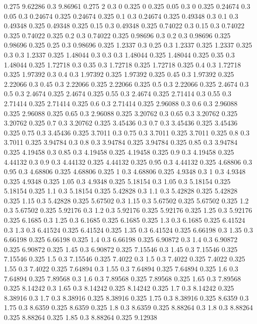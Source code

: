 0.275 9.62286
0.3 9.86961
0.275 2
0.3 0
0.325 0
0.325 0.05
0.3 0
0.325 0.24674
0.3 0.05
0.3 0.24674
0.325 0.24674
0.325 0.1
0.3 0.24674
0.325 0.49348
0.3 0.1
0.3 0.49348
0.325 0.49348
0.325 0.15
0.3 0.49348
0.325 0.74022
0.3 0.15
0.3 0.74022
0.325 0.74022
0.325 0.2
0.3 0.74022
0.325 0.98696
0.3 0.2
0.3 0.98696
0.325 0.98696
0.325 0.25
0.3 0.98696
0.325 1.2337
0.3 0.25
0.3 1.2337
0.325 1.2337
0.325 0.3
0.3 1.2337
0.325 1.48044
0.3 0.3
0.3 1.48044
0.325 1.48044
0.325 0.35
0.3 1.48044
0.325 1.72718
0.3 0.35
0.3 1.72718
0.325 1.72718
0.325 0.4
0.3 1.72718
0.325 1.97392
0.3 0.4
0.3 1.97392
0.325 1.97392
0.325 0.45
0.3 1.97392
0.325 2.22066
0.3 0.45
0.3 2.22066
0.325 2.22066
0.325 0.5
0.3 2.22066
0.325 2.4674
0.3 0.5
0.3 2.4674
0.325 2.4674
0.325 0.55
0.3 2.4674
0.325 2.71414
0.3 0.55
0.3 2.71414
0.325 2.71414
0.325 0.6
0.3 2.71414
0.325 2.96088
0.3 0.6
0.3 2.96088
0.325 2.96088
0.325 0.65
0.3 2.96088
0.325 3.20762
0.3 0.65
0.3 3.20762
0.325 3.20762
0.325 0.7
0.3 3.20762
0.325 3.45436
0.3 0.7
0.3 3.45436
0.325 3.45436
0.325 0.75
0.3 3.45436
0.325 3.7011
0.3 0.75
0.3 3.7011
0.325 3.7011
0.325 0.8
0.3 3.7011
0.325 3.94784
0.3 0.8
0.3 3.94784
0.325 3.94784
0.325 0.85
0.3 3.94784
0.325 4.19458
0.3 0.85
0.3 4.19458
0.325 4.19458
0.325 0.9
0.3 4.19458
0.325 4.44132
0.3 0.9
0.3 4.44132
0.325 4.44132
0.325 0.95
0.3 4.44132
0.325 4.68806
0.3 0.95
0.3 4.68806
0.325 4.68806
0.325 1
0.3 4.68806
0.325 4.9348
0.3 1
0.3 4.9348
0.325 4.9348
0.325 1.05
0.3 4.9348
0.325 5.18154
0.3 1.05
0.3 5.18154
0.325 5.18154
0.325 1.1
0.3 5.18154
0.325 5.42828
0.3 1.1
0.3 5.42828
0.325 5.42828
0.325 1.15
0.3 5.42828
0.325 5.67502
0.3 1.15
0.3 5.67502
0.325 5.67502
0.325 1.2
0.3 5.67502
0.325 5.92176
0.3 1.2
0.3 5.92176
0.325 5.92176
0.325 1.25
0.3 5.92176
0.325 6.1685
0.3 1.25
0.3 6.1685
0.325 6.1685
0.325 1.3
0.3 6.1685
0.325 6.41524
0.3 1.3
0.3 6.41524
0.325 6.41524
0.325 1.35
0.3 6.41524
0.325 6.66198
0.3 1.35
0.3 6.66198
0.325 6.66198
0.325 1.4
0.3 6.66198
0.325 6.90872
0.3 1.4
0.3 6.90872
0.325 6.90872
0.325 1.45
0.3 6.90872
0.325 7.15546
0.3 1.45
0.3 7.15546
0.325 7.15546
0.325 1.5
0.3 7.15546
0.325 7.4022
0.3 1.5
0.3 7.4022
0.325 7.4022
0.325 1.55
0.3 7.4022
0.325 7.64894
0.3 1.55
0.3 7.64894
0.325 7.64894
0.325 1.6
0.3 7.64894
0.325 7.89568
0.3 1.6
0.3 7.89568
0.325 7.89568
0.325 1.65
0.3 7.89568
0.325 8.14242
0.3 1.65
0.3 8.14242
0.325 8.14242
0.325 1.7
0.3 8.14242
0.325 8.38916
0.3 1.7
0.3 8.38916
0.325 8.38916
0.325 1.75
0.3 8.38916
0.325 8.6359
0.3 1.75
0.3 8.6359
0.325 8.6359
0.325 1.8
0.3 8.6359
0.325 8.88264
0.3 1.8
0.3 8.88264
0.325 8.88264
0.325 1.85
0.3 8.88264
0.325 9.12938
